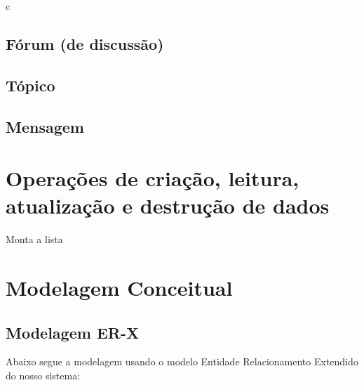 c\documentclass{article}
\begin{document}
	\subsection{Fórum (de discussão)}

	\subsection{Tópico}

	\subsection{Mensagem}


\section{Operações de criação, leitura, atualização e destrução de dados}

	Monta a lista


\section{Modelagem Conceitual}

	\subsection{Modelagem ER-X}
	Abaixo segue a modelagem usando o modelo Entidade Relacionamento Extendido do nosso sistema:\\
	
\end{document}
